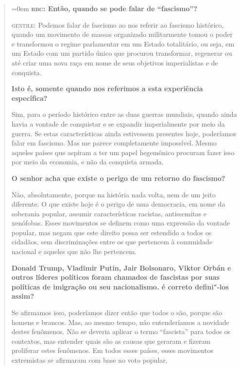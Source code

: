 \begin{quote}\parindent=0em
\textbf{\textsc{bbc}: Então, quando se pode falar de ``fascismo''?}

\textsc{gentile:} Podemos falar de fascismo ao nos referir ao fascismo
histórico, quando um movimento de massas organizado militarmente tomou o
poder e transformou o regime parlamentar em um Estado totalitário, ou
seja, em um Estado com um partido único que procurou transformar,
regenerar ou até criar uma nova raça em nome de seus objetivos
imperialistas e de conquista.

\medskip

\noindent\textbf{Isto é, somente quando nos referimos a esta experiência
específica?}

Sim, para o período histórico entre as duas guerras
mundiais, quando ainda havia a vontade de conquistar e se expandir
imperialmente por meio da guerra. Se estas características ainda
estivessem presentes hoje, poderíamos falar em fascismo. Mas me parece
completamente impossível. Mesmo aqueles países que aspiram a ter um
papel hegemônico procuram fazer isso por meio da economia, e não da
conquista armada.

\medskip

\noindent\textbf{O senhor acha que existe o perigo de um retorno do fascismo?}

Não, absolutamente, porque na história nada volta,
nem de um jeito diferente. O que existe hoje é o perigo de uma
democracia, em nome da soberania popular, assumir características
racistas, antissemitas e xenófobas. Esses movimentos se definem como uma
expressão da vontade popular, mas negam que este direito possa ser
estendido a todos os cidadãos, sem discriminações entre os que pertencem
à comunidade nacional e aqueles que não lhe pertencem.

\medskip

\noindent\textbf{Donald Trump, Vladimir Putin, Jair Bolsonaro, Viktor
Orbán e outros líderes políticos foram chamados de fascistas por suas
políticas de imigração ou seu nacionalismo. é correto defini"-los assim?}

Se afirmamos isso, poderíamos dizer então que todos
o são, porque são homens e brancos. Mas, ao mesmo tempo, não
entenderíamos a novidade destes fenômenos. Não se deveria aplicar o
termo ``fascista'' para todos os contextos, mas entender quais são as
causas que geraram e fizeram proliferar estes fenômenos. Em todos esses
países, esses movimentos extremistas se afirmaram com base no voto
popular.


\end{quote}
